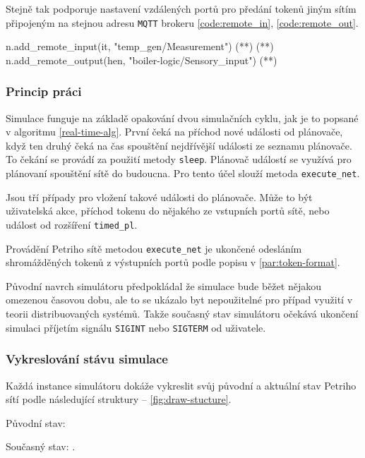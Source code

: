 Stejně tak podporuje nastavení vzdálených portů pro předání tokenů jiným sítím připojeným na stejnou adresu \texttt{MQTT} brokeru \ref{code:remote_in}, \ref{code:remote_out}.

\begin{python}
 n.add_remote_input(it, "temp_gen/Measurement") (*\label{code:remote_in}*) (*\label{code:remote-in-out}*)
 n.add_remote_output(hen, "boiler-logic/Sensory_input") (*\label{code:remote_out}*)
\end{python}

\subsubsection{Princip práci}

Simulace funguje na základě opakování dvou simulačních cyklu, jak je to popsané v algoritmu \ref{real-time-alg}. První čeká na příchod nové události od plánovače, když ten druhý čeká na čas spouštění nejdřívější události ze seznamu plánovače. To čekání se provádí za použití metody \texttt{sleep}. Plánovač událostí se využívá pro plánovaní spouštění sítě do budoucna. Pro tento účel slouží metoda \texttt{execute\_net}.

Jsou tří případy pro vložení takové události do plánovače. Může to být uživatelská akce, příchod tokenu do nějakého ze vstupních portů sítě, nebo událost od rozšíření \texttt{timed\_pl}.

Provádění Petriho sítě metodou \texttt{execute\_net} je ukončené odesláním shromážděných tokenů z výstupních portů podle popisu v \ref{par:token-format}.

Původní navrch simulátoru předpokládal že simulace bude běžet nějakou omezenou časovou dobu, ale to se ukázalo byt nepoužitelné pro případ využití v teorii distribuovaných systémů. Takže současný stav simulátoru očekává ukončení simulaci příjetím signálu \texttt{SIGINT} nebo \texttt{SIGTERM} od uživatele.

\subsubsection{Vykreslování stávu simulace}

Každá instance simulátoru dokáže vykreslit svůj původní a aktuální stav Petriho sítí podle následující struktury -- \ref{fig:draw-stucture}.

Původní stav: 

Současný stav: .


